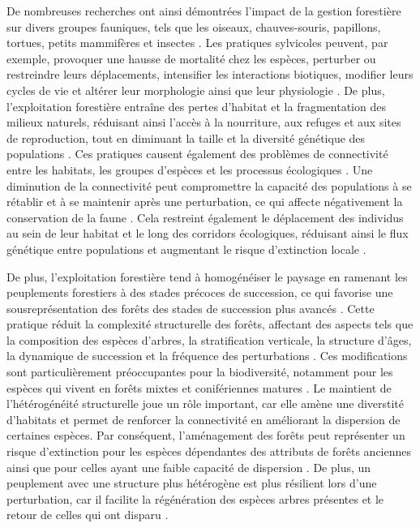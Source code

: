 De nombreuses recherches ont ainsi démontrées l'impact de la gestion forestière sur divers groupes fauniques, tels que les oiseaux, chauves-souris, papillons, tortues, petits mammifères et insectes \citep{Summerville2011Managingforest, Currylow2012ShortTermForest, Kaminski2013EffectsForest, Kellner2013Shorttermresponses, Caldwell2019ComparisonBat}. 
Les pratiques sylvicoles peuvent, par exemple, provoquer une hausse de mortalité chez les espèces, perturber ou restreindre leurs déplacements, intensifier les interactions biotiques, modifier leurs cycles de vie et altérer leur morphologie ainsi que leur physiologie \citep{Sergio2018Animalresponses}. 
De plus, l'exploitation forestière entraîne des pertes d'habitat et la fragmentation des milieux naturels, réduisant ainsi l'accès à la nourriture, aux refuges et aux sites de reproduction, tout en diminuant la taille et la diversité génétique des populations \citep{Bouderbala2023Longtermeffect}.
Ces pratiques causent également des problèmes de connectivité entre les habitats, les groupes d'espèces et les processus écologiques \citep{Lindenmayer2006Generalmanagement}. 
Une diminution de la connectivité peut compromettre la capacité des populations à se rétablir et à se maintenir après une perturbation, ce qui affecte négativement la conservation de la faune \citep{Lamberson1994ReserveDesign}. 
Cela restreint également le déplacement des individus au sein de leur habitat et le long des corridors écologiques, réduisant ainsi le flux génétique entre populations et augmentant le risque d'extinction locale \citep{Saccheri1998Inbreedingextinction}. 

De plus, l'exploitation forestière tend à homogénéiser le paysage en ramenant les peuplements forestiers à des stades précoces de succession, ce qui favorise une sousreprésentation des forêts des stades de succession plus avancés \citep{Cyr2009Forestmanagement,Boucher2017Cumulativepatterns}. 
Cette pratique réduit la complexité structurelle des forêts, affectant des aspects tels que la composition des espèces d'arbres, la stratification verticale, la structure d'âges, la dynamique de succession et la fréquence des perturbations \citep{Commarmot2005Structurevirgin}. 
Ces modifications sont particulièrement préoccupantes pour la biodiversité, notamment pour les espèces qui vivent en forêts mixtes et conifériennes matures \citep{Tremblay2018Harvestinginteracts,Cadieux2020Projectedeffects}.
Le maintient de l'hétérogénéité structurelle joue un rôle important, car elle amène une diverstité d'habitats et permet de renforcer la connectivité en améliorant la dispersion de certaines espèces. 
Par conséquent, l'aménagement des forêts peut représenter un risque d'extinction pour les espèces dépendantes des attributs de forêts anciennes ainsi que pour celles ayant une faible capacité de dispersion \citep{Norden2001Conceptualproblems,Martin2021indicatorspecies}. 
De plus, un peuplement avec une structure plus hétérogène est plus résilient lors d'une perturbation, car il facilite la régénération des espèces arbres présentes et le retour de celles qui ont disparu \citep{Kuuluvainen2009Forestmanagement}. 


